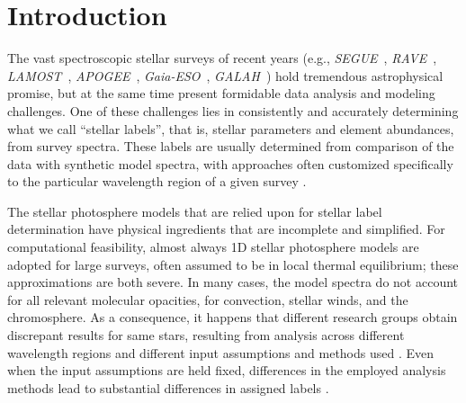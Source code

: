 \documentclass[12pt, preprint]{aastex}
\newcommand{\apogee}{\textsl{APOGEE}}
\newcommand{\galah}{\textsl{GALAH}}
\newcommand{\segue}{\textsl{SEGUE}}
\newcommand{\gaiaeso}{\textsl{Gaia-ESO}}
\newcommand{\rave}{\textsl{RAVE}}
\newcommand{\lamost}{\textsl{LAMOST}}
\begin{document}

\section{Introduction}\label{sec:Intro}

The vast spectroscopic stellar surveys of recent years (e.g., \segue\ \citep{Beers2006}, \rave\ \citep{Steinmetz2006}, \lamost\ \citep{Newberg2012}, \apogee\ \citep{Majewski2012}, \gaiaeso\ \citep{Gilmore2012}, \galah\ \citep{Freeman2012}) hold tremendous astrophysical promise, but at the same time present formidable data analysis and modeling challenges. 
One of these challenges lies in consistently and accurately determining what we call ``stellar labels'', that is, stellar parameters and element abundances, from survey spectra. 
These labels are usually determined from comparison of the data with synthetic model spectra, with approaches often 
customized specifically to the particular wavelength region of a given survey \citep[e.g.,][]{ Lee2006, Boeche2011, Liu2014, Meszaros2013, SM2014}. 

The stellar photosphere models that are relied upon for stellar label determination have physical ingredients that are incomplete and simplified. 
For computational feasibility, almost always 1D stellar photosphere models are adopted for large surveys, often assumed to be in local thermal equilibrium; these approximations are both severe. 
In many cases, the model spectra do not account for all relevant molecular opacities, for convection, stellar winds, and the chromosphere. 
As a consequence, it happens that different research groups obtain discrepant results for same stars, resulting from analysis across different wavelength regions and different input assumptions and methods used \citep[e.g.,][]{Hinkel2014, Jofre2014, AP1999}. Even when the input assumptions are held fixed, differences in the employed analysis methods lead to substantial differences in assigned labels \citep[e.g.][]{SM2014}.
\end{document}
